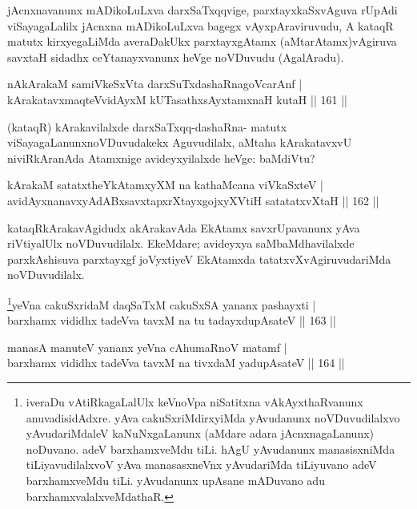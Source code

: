 \begin{artha}
jAcnxnavanunx mADikoLuLxva darxSaTxqqvige, parxtayxkaSxvAguva rUpAdi viSayagaLalilx jAcnxna mADikoLuLxva bagegx vAyxpAraviruvudu, A kataqR matutx kirxyegaLiMda averaDakUkx parxtayxgAtamx (aMtarAtamx)vAgiruva savxtaH sidadhx ceYtanayxvanunx heVge noVDuvudu (AgalAradu).
\end{artha}

\begin{shl}
nAkArakaM samiVkeSxVta darxSuTxdashaRnagoVcarAnf |\\
kArakatavxmaqteV\s vidAyxM kUTasathxsAyx\s \s tamxnaH kutaH \hfill || 161 ||
\end{shl}

\begin{artha}
(kataqR) kArakavilalxde darxSaTxqq-dashaRna- matutx viSayagaLanunx\break noVDuvudakekx Aguvudilalx, aMtaha kArakatavxvU niviRkAranAda Atamxnige avideyxyilalxde heVge: baMdiVtu?
\end{artha}

\begin{shl}
kArakaM satatxtheYkAtamxyXM na kathaMcana viVkaSxteV |\\
avidAyxnanavxyAdABxsavxtapxrXtayxgojxyXVtiH satatatxvXtaH \hfill || 162 ||
\end{shl}

\begin{artha}
kataqRkArakavAgidudx akArakavAda EkAtamx savxrUpavanunx yAva riVtiyalUlx noVDuvudilalx. EkeMdare; avideyxya saMbaMdhavilalxde parxkAshisuva parxtayxgf joVyxtiyeV EkAtamxda tatatxvXvAgiruvudariMda noVDuvudilalx.
\end{artha}


\begin{shl}
\footnote{iveraDu vAtiRkagaLalUlx keVnoVpa niSatitxna vAkAyxthaRvanunx anuvadisidAdxre. yAva cakuSxriMdirxyiMda yAvudanunx noVDuvudilalxvo yAvudariMdaleV kaNuNxgaLanunx (aMdare adara jAcnxnagaLanunx) noDuvano. adeV barxhamxveMdu tiLi. hAgU yAvudanunx manasisxniMda tiLiyavudilalxvoV yAva manasasxneVnx yAvudariMda tiLiyuvano adeV barxhamxveMdu tiLi. yAvudanunx upAsane mADuvano adu barxhamxvalalxveMdathaR.}yeVna cakuSxridaM daqSaTxM cakuSxSA yananx pashayxti |\\
barxhamx vididhx tadeVva tavxM na tu tadayxdupAsateV \hfill || 163 ||
\end{shl}

\begin{shl}
manasA manuteV yananx yeVna cA\s \s humaRnoV matamf |\\
barxhamx vididhx tadeVva tavxM na tivxdaM yadupAsateV \hfill || 164 ||
\end{shl}

